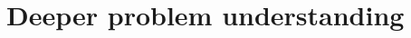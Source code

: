 \documentclass[../main.tex]{subfiles}
\begin{document}
\section{Deeper problem understanding}

\Blindtext
\end{document}
